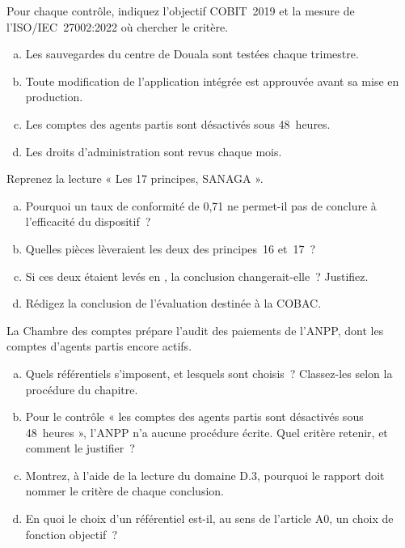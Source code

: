 \bigskip

\begin{boxexo}[title={\ding{45}\quad Exercice~14.1. Trouver le critère \niveaubase}]
Pour chaque contrôle, indiquez l'objectif COBIT~2019 et la mesure de
l'ISO/IEC~27002:2022 où chercher le critère.
\begin{enumerate}[(a)]
    \item Les sauvegardes du centre de Douala sont testées chaque trimestre.
    \item Toute modification de l'application intégrée est approuvée avant
          sa mise en production.
    \item Les comptes des agents partis sont désactivés sous 48~heures.
    \item Les droits d'administration sont revus chaque mois.
\end{enumerate}
\end{boxexo}

\begin{boxexo}[title={\ding{45}\quad Exercice~14.2. Conclure selon le COSO \niveaumoyen}]
Reprenez la lecture « Les 17 principes, SANAGA ».
\begin{enumerate}[(a)]
    \item Pourquoi un taux de conformité de 0,71 ne permet-il pas de
          conclure à l'efficacité du dispositif~?
    \item Quelles pièces lèveraient les deux \NEK{} des principes~16 et~17~?
    \item Si ces deux \NEK{} étaient levés en \OUI{}, la conclusion
          changerait-elle~? Justifiez.
    \item Rédigez la conclusion de l'évaluation destinée à la COBAC.
\end{enumerate}
\end{boxexo}

\begin{boxexo}[title={\ding{45}\quad Exercice~14.3. Choisir les référentiels de l'ANPP \niveauexpert}]
La Chambre des comptes prépare l'audit des paiements de l'ANPP, dont les
comptes d'agents partis encore actifs.
\begin{enumerate}[(a)]
    \item Quels référentiels s'imposent, et lesquels sont choisis~?
          Classez-les selon la procédure du chapitre.
    \item Pour le contrôle « les comptes des agents partis sont désactivés
          sous 48~heures », l'ANPP n'a aucune procédure écrite. Quel critère
          retenir, et comment le justifier~?
    \item Montrez, à l'aide de la lecture du domaine D.3, pourquoi le rapport
          doit nommer le critère de chaque conclusion.
    \item En quoi le choix d'un référentiel est-il, au sens de l'article A0,
          un choix de fonction objectif~?
\end{enumerate}
\end{boxexo}

